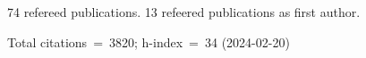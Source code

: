 74 refereed publications. 13 refeered publications as first author.

Total citations~=~3820; h-index~=~34 (2024-02-20)